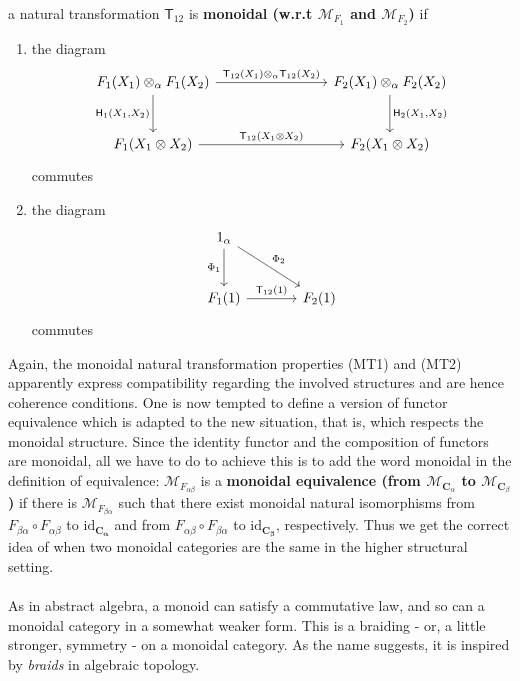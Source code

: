a natural transformation $\mathsf{T}_{12}$ is \textbf{monoidal (w.r.t $\mathcal{M}_{F_{1}}$ and $\mathcal{M}_{F_{2}}$)} if
\begin{enumerate}
\item[(MT1)]
the diagram
\[
\begin{tikzcd}[row sep=large,column sep=8em]
  F_{1}(X_{1})
  \otimes_{\alpha}
  F_{1}(X_{2})
  \arrow{r}{\mathsf{T}_{12}(X_{1}) \otimes_{\alpha} \mathsf{T}_{12}(X_{2})}
  \arrow[swap]{d}{\mathsf{H}_{1}(X_{1},X_{2})}
  &
  F_{2}(X_{1})
  \otimes_{\alpha}
  F_{2}(X_{2})
  \arrow{d}{\mathsf{H}_{2}(X_{1},X_{2})}
  \\
  F_{1}(X_{1} \otimes X_{2})
  \arrow{r}{\mathsf{T}_{12}(X_{1} \otimes X_{2})}
  &
  F_{2}(X_{1} \otimes X_{2})
\end{tikzcd}
\]
commutes
\item[(MT2)]
the diagram
\[
\begin{tikzcd}[sep=large]
  1_{\alpha}
  \arrow{dr}{\Phi_{2}}
  \arrow{d}[swap]{\Phi_{1}}
  &
  \\
  F_{1}(1)
  \arrow{r}{\mathsf{T}_{12}(1)}
  &
  F_{2}(1)
\end{tikzcd}
\]
commutes
\end{enumerate}
Again, the monoidal natural transformation properties (MT1) and (MT2) apparently express compatibility regarding the involved structures and are hence coherence conditions.
One is now tempted to define a version of functor equivalence which is adapted to the new situation, that is, which respects the monoidal structure.
Since the identity functor and the composition of functors are monoidal, all we have to do to achieve this is to add the word monoidal in the definition of equivalence: $\mathcal{M}_{F_{\alpha\beta}}$ is a \textbf{monoidal equivalence (from $\mathcal{M}_{\mathbf{C}_{\alpha}}$ to $\mathcal{M}_{\mathbf{C}_{\beta}}$)} if there is $\mathcal{M}_{F_{\beta\alpha}}$ such that there exist monoidal natural isomorphisms from $F_{\beta\alpha} \circ F_{\alpha\beta}$ to $\mathrm{id}_{\mathbf{C_{\alpha}}}$ and from $F_{\alpha\beta} \circ F_{\beta\alpha} $ to $\mathrm{id}_{\mathbf{C_{\beta}}}$, respectively.
Thus we get the correct idea of when two monoidal categories are {\glqq}the same{\grqq} in the higher structural setting.
\\\\
As in abstract algebra, a monoid can satisfy a commutative law, and so can a monoidal category in a somewhat weaker form.
This is a braiding - or, a little stronger, symmetry - on a monoidal category.
As the name suggests, it is inspired by \textit{braids} in algebraic topology.
